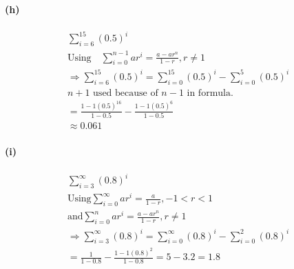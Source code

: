 {\begin{multicols}{2}
        \horizontal

        \paragraph{(h)}
        \begin{equation*}
            \begin{gathered}
                \sum_{i=6}^{15}(0.5)^i
                \\
                \text{Using} \quad \sum_{i=0}^{n-1} ar^i = \frac{a-ar^n}{1-r}, r \neq 1
                \\
                \Rightarrow \sum_{i=6}^{15}(0.5)^i = \sum_{i=0}^{15}(0.5)^i - \sum_{i=0}^{5}(0.5)^i
                \\
                n + 1 \text{ used because of } n-1 \text{ in formula.}
                \\
                = \frac{1-1(0.5)^{16}}{1-0.5} - \frac{1-1(0.5)^6}{1-0.5} 
                \\
                \approx \boxed{0.061}
            \end{gathered}
        \end{equation*}

        \paragraph{(i)}
        \begin{equation*}
            \begin{gathered}
                \sum_{i=3}^{\infty}(0.8)^i
                \\
                \text{Using} \sum_{i=0}^{\infty}ar^i = \frac{a}{1-r}, -1 < r < 1
                \\
                \text{and} \sum_{i=0}^{n}ar^i = \frac{a - ar^n}{1 - r}, r \neq 1
                \\
                \Rightarrow \sum_{i=3}^{\infty}(0.8)^i = \sum_{i=0}^{\infty}(0.8)^i - \sum_{i=0}^{2}(0.8)^i
                \\
                = \frac{1}{1 - 0.8} - \frac{1 - 1(0.8)^2}{1 - 0.8} = 5 - 3.2 = \boxed{1.8}
            \end{gathered}
        \end{equation*}

    \end{multicols}
    }
    
